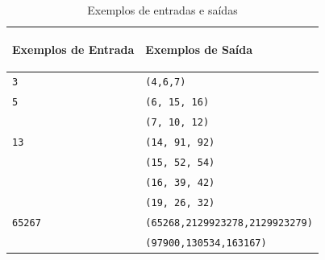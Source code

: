 \begin{table}[h]
    \centering
    \begin{tabular}{|p{7cm}|p{7cm}|}
        \hline
        \begin{center}
            \vspace{-0.3cm}
            \textbf{Exemplos de Entrada}
            \vspace{-0.3cm}
        \end{center} 
         &  
        \begin{center}
            \vspace{-0.3cm}
            \textbf{Exemplos de Saída}
            \vspace{-0.3cm}
        \end{center} \\ \hline
         \texttt{3} & \texttt{(4,6,7)} \\  
         \hline
         \texttt{5} & \texttt{(6, 15, 16)} \\ 
          & \texttt{(7, 10, 12)} \\ 
         \hline
         \texttt{13} & \texttt{(14, 91, 92)} \\
         & \texttt{(15, 52, 54)} \\
         & \texttt{(16, 39, 42)} \\
         & \texttt{(19, 26, 32)} \\ 
         \hline
         \texttt{65267} & \texttt{(65268,2129923278,2129923279)} \\ 
          & \texttt{(97900,130534,163167)} \\ 
         \hline
    \end{tabular}
    \caption{Exemplos de entradas e saídas}

\end{table}

\newpage
\begin{center}
\noindent

\end{center}